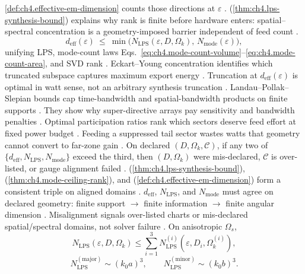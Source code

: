 \ref{def:ch4.effective-em-dimension} counts those directions at \(\varepsilon\) \cite{harrington2001}.
(\ref{thm:ch4.lps-synthesis-bound}) explains why rank is finite before hardware enters: spatial--spectral concentration is a geometry-imposed
barrier independent of feed count \cite{hansen1988}.
\begin{equation}
\label{eq:ch4.lps-export-ceiling}
d_{\mathrm{eff}}(\varepsilon)\ \le\ \min\big(N_{\mathrm{LPS}}(\varepsilon,D,\Omega_{k}),\,N_{\mathrm{mode}}(\varepsilon)\big),
\end{equation}
unifying LPS, mode-count laws Eqs.~\eqref{eq:ch4.mode-count-volume}--\eqref{eq:ch4.mode-count-area}, and SVD rank \cite{hansen1988}.
Eckart--Young concentration identifies which truncated subspace captures maximum export energy \cite{hansen1988}. Truncation at $d_{\mathrm{eff}}(\varepsilon)$ is optimal in watt sense, not an arbitrary synthesis truncation \cite{stratton1941}.
Landau--Pollak--Slepian bounds cap time-bandwidth and spatial-bandwidth products on finite supports \cite{landau1962}. They show why super-directive arrays pay sensitivity and bandwidth penalties \cite{stratton1941}.
Optimal participation ratios rank which sectors deserve feed effort at fixed power budget \cite{harrington2001}. Feeding a suppressed tail sector wastes watts that geometry cannot convert to far-zone gain \cite{stratton1941}.
\label{thm:ch4.triple-ceiling}
On declared \((D,\Omega_{k},\mathcal{C})\), if any two of \(\{d_{\mathrm{eff}},N_{\mathrm{LPS}},N_{\mathrm{mode}}\}\) exceed the third, then
\((D,\Omega_{k})\) were mis-declared, \(\mathcal{C}\) is over-listed, or gauge alignment failed \cite{hansen1988}.
(\ref{thm:ch4.lps-synthesis-bound}), (\ref{thm:ch4.mode-ceiling-rank}), and (\ref{def:ch4.effective-em-dimension}) form a
consistent triple on aligned domains \cite{stratton1941}.
$d_{\mathrm{eff}}$, $N_{\mathrm{LPS}}$, and $N_{\mathrm{mode}}$ must agree on declared geometry: finite support $\to$ finite information $\to$ finite angular dimension \cite{landau1962}. Misalignment signals over-listed charts or mis-declared spatial/spectral domains, not solver failure \cite{harrington2001}.
On anisotropic \(\Omega_{s}\),
\begin{equation}
\label{eq:ch4.lps-anisotropy}
N_{\mathrm{LPS}}(\varepsilon,D,\Omega_{k})\le\sum_{i=1}^{3}N_{\mathrm{LPS}}^{(i)}(\varepsilon,D_{i},\Omega_{k}^{(i)}),
\end{equation}
\begin{equation}
\label{eq:ch4.prolate-nwidth}
N_{\mathrm{LPS}}^{(\mathrm{major})}\sim(k_{0}a)^{3},\qquad N_{\mathrm{LPS}}^{(\mathrm{minor})}\sim(k_{0}b)^{3}.
\end{equation}
